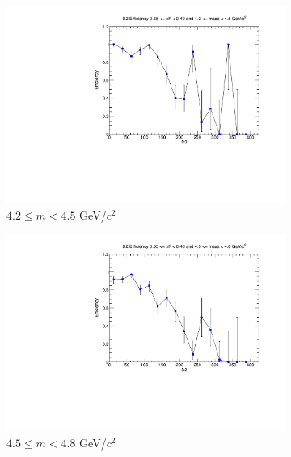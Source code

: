 \begin{figure}[p]
    \centering
    \begin{subfigure}[b]{0.32\textwidth}
        \centering
        \includegraphics[width=\textwidth]{./kTrackerEfficiencyPlots/D2_Efficiency_xF7_mass0.pdf}
        \caption{$4.2 \leq m < 4.5$ GeV/$c^2$}
        \label{fig:xF7_mass0}
    \end{subfigure}
    \hfill
    \begin{subfigure}[b]{0.32\textwidth}
        \centering
        \includegraphics[width=\textwidth]{./kTrackerEfficiencyPlots/D2_Efficiency_xF7_mass1.pdf}
        \caption{$4.5 \leq m < 4.8$ GeV/$c^2$}
        \label{fig:xF7_mass1}
    \end{subfigure}
    \hfill
    \begin{subfigure}[b]{0.32\textwidth}

\end{subfigure}
\end{figure}

